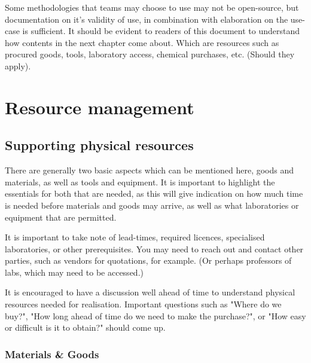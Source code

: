 \documentclass{report}
\begin{document}
        \noindent
        Some methodologies that teams may choose to use may not be open-source, but documentation on it's validity of use, in combination with elaboration on the use-case is sufficient. It should be evident to readers of this document to understand how contents in the next chapter come about. Which are resources such as procured goods, tools, laboratory access, chemical purchases, etc. (Should they apply).




\chapter{Resource management}


 	\section{Supporting physical resources }
        There are generally two basic aspects which can be mentioned here, goods and materials, as well as tools and equipment. It is important to highlight the essentials for both that are needed, as this will give indication on how much time is needed before materials and goods may arrive, as well as what laboratories or equipment that are permitted.
        \newline

        \noindent
        It is important to take note of lead-times, required licences, specialised laboratories, or other prerequisites. You may need to reach out and contact other parties, such as vendors for quotations, for example. (Or perhaps professors of labs, which may need to be accessed.)
        \newline

        \noindent
        It is encouraged to have a discussion well ahead of time to understand physical resources needed for realisation. Important questions such as "Where do we buy?", "How long ahead of time do we need to make the purchase?", or "How easy or difficult is it to obtain?" should come up.

        \subsection{Materials \& Goods}
        \lipsum[4]
\end{document}
